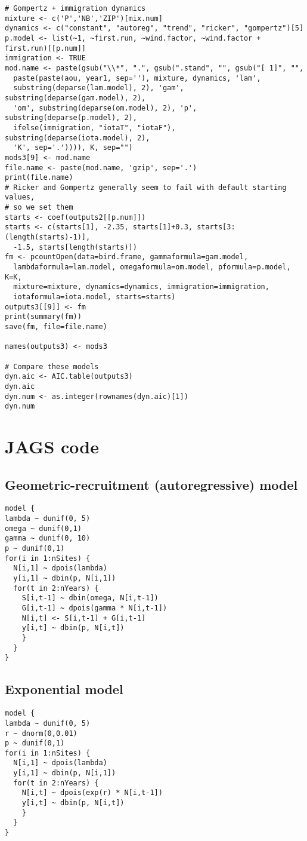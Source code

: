 \documentclass[12pt]{article}
\begin{document}
\begin{verbatim}
# Gompertz + immigration dynamics
mixture <- c('P','NB','ZIP')[mix.num]
dynamics <- c("constant", "autoreg", "trend", "ricker", "gompertz")[5]
p.model <- list(~1, ~first.run, ~wind.factor, ~wind.factor + first.run)[[p.num]]
immigration <- TRUE
mod.name <- paste(gsub("\\*", ".", gsub(".stand", "", gsub("[ 1]", "", 
  paste(paste(aou, year1, sep=''), mixture, dynamics, 'lam', 
  substring(deparse(lam.model), 2), 'gam', substring(deparse(gam.model), 2), 
  'om', substring(deparse(om.model), 2), 'p', substring(deparse(p.model), 2), 
  ifelse(immigration, "iotaT", "iotaF"), substring(deparse(iota.model), 2),
  'K', sep='.')))), K, sep="")
mods3[9] <- mod.name
file.name <- paste(mod.name, 'gzip', sep='.')
print(file.name)
# Ricker and Gompertz generally seem to fail with default starting values, 
# so we set them
starts <- coef(outputs2[[p.num]])
starts <- c(starts[1], -2.35, starts[1]+0.3, starts[3:(length(starts)-1)], 
  -1.5, starts[length(starts)])
fm <- pcountOpen(data=bird.frame, gammaformula=gam.model, 
  lambdaformula=lam.model, omegaformula=om.model, pformula=p.model, K=K, 
  mixture=mixture, dynamics=dynamics, immigration=immigration, 
  iotaformula=iota.model, starts=starts)
outputs3[[9]] <- fm
print(summary(fm))
save(fm, file=file.name)

names(outputs3) <- mods3

# Compare these models
dyn.aic <- AIC.table(outputs3)
dyn.aic
dyn.num <- as.integer(rownames(dyn.aic)[1])
dyn.num
\end{verbatim}



\section{\textbf{JAGS} code}

\subsection{Geometric-recruitment (autoregressive) model}
\begin{verbatim}
model {
lambda ~ dunif(0, 5)
omega ~ dunif(0,1)
gamma ~ dunif(0, 10)
p ~ dunif(0,1)
for(i in 1:nSites) {
  N[i,1] ~ dpois(lambda)
  y[i,1] ~ dbin(p, N[i,1])
  for(t in 2:nYears) {
    S[i,t-1] ~ dbin(omega, N[i,t-1])
    G[i,t-1] ~ dpois(gamma * N[i,t-1])
    N[i,t] <- S[i,t-1] + G[i,t-1]
    y[i,t] ~ dbin(p, N[i,t])
    }
  }
}
\end{verbatim}

\subsection{Exponential model}
\begin{verbatim}
model {
lambda ~ dunif(0, 5)
r ~ dnorm(0,0.01)
p ~ dunif(0,1)
for(i in 1:nSites) {
  N[i,1] ~ dpois(lambda)
  y[i,1] ~ dbin(p, N[i,1])
  for(t in 2:nYears) {
    N[i,t] ~ dpois(exp(r) * N[i,t-1])
    y[i,t] ~ dbin(p, N[i,t])
    }
  }
}
\end{verbatim}
\end{document}
